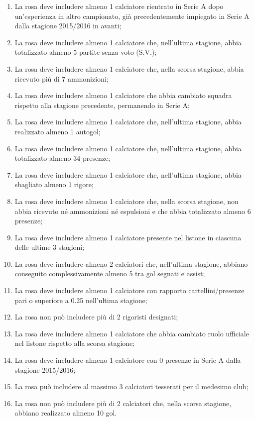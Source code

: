 \begin{enumerate}
    \item La rosa deve includere almeno 1 calciatore rientrato in Serie A dopo un’esperienza in altro campionato, già precedentemente impiegato in Serie A dalla stagione 2015/2016 in avanti;
    \item La rosa deve includere almeno 1 calciatore che, nell’ultima stagione, abbia totalizzato almeno 5 partite senza voto (S.V.);
    \item La rosa deve includere almeno 1 calciatore che, nella scorsa stagione, abbia ricevuto più di 7 ammonizioni;
    \item La rosa deve includere almeno 1 calciatore che abbia cambiato squadra rispetto alla stagione precedente, permanendo in Serie A;
    \item La rosa deve includere almeno 1 calciatore che, nell’ultima stagione, abbia realizzato almeno 1 autogol;
    \item La rosa deve includere almeno 1 calciatore che, nell’ultima stagione, abbia totalizzato almeno 34 presenze;
    \item La rosa deve includere almeno 1 calciatore che, nell’ultima stagione, abbia sbagliato almeno 1 rigore;
    \item La rosa deve includere almeno 1 calciatore che, nella scorsa stagione, non abbia ricevuto né ammonizioni né espulsioni e che abbia totalizzato almeno 6 presenze;
    \item La rosa deve includere almeno 1 calciatore presente nel listone in ciascuna delle ultime 3 stagioni;
    \item La rosa deve includere almeno 2 calciatori che, nell’ultima stagione, abbiano conseguito complessivamente almeno 5 tra gol segnati e assist;
    \item La rosa deve includere almeno 1 calciatore con rapporto cartellini/presenze pari o superiore a 0.25 nell’ultima stagione;
    \item La rosa non può includere più di 2 rigoristi designati;
    \item La rosa deve includere almeno 1 calciatore che abbia cambiato ruolo ufficiale nel listone rispetto alla scorsa stagione;
    \item La rosa deve includere almeno 1 calciatore con 0 presenze in Serie A dalla stagione 2015/2016;
    \item La rosa può includere al massimo 3 calciatori tesserati per il medesimo club;
    \item La rosa non può includere più di 2 calciatori che, nella scorsa stagione, abbiano realizzato almeno 10 gol.
\end{enumerate}

